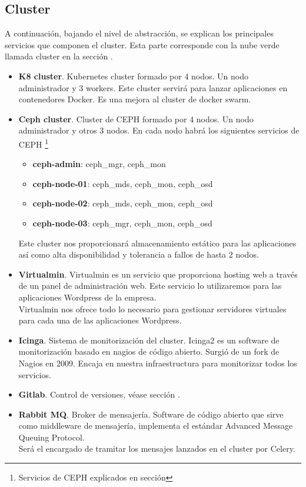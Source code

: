 	\subsection{Cluster}
		\begin{text}
			A continuación, bajando el nivel de abstracción, se explican los principales servicios que componen el cluster. Esta parte corresponde con la nube verde llamada cluster en la sección .
			\begin{itemize}
				\item \textbf{K8 cluster}. Kubernetes cluster formado por 4 nodos. Un nodo administrador y 3 workers. Este cluster servirá para lanzar aplicaciones en contenedores Docker. Es una mejora al cluster de docker swarm.
				\item \textbf{Ceph cluster}. Cluster de CEPH formado por 4 nodos. Un nodo administrador y otros 3 nodos. En cada nodo habrá los siguientes servicios de CEPH \footnote{Servicios de CEPH explicados en sección }
				\begin{itemize}
					\item \textbf{ceph-admin}: ceph\_mgr, ceph\_mon
					\item \textbf{ceph-node-01}: ceph\_mds, ceph\_mon, ceph\_osd
					\item \textbf{ceph-node-02}: ceph\_mds, ceph\_mon, ceph\_osd
					\item \textbf{ceph-node-03}: ceph\_mgr, ceph\_mon, ceph\_osd
				\end{itemize}
				Este cluster nos proporcionará almacenamiento estático para las aplicaciones así como alta disponibilidad y tolerancia a fallos de hasta 2 nodos.
				
				\item \textbf{Virtualmin}. Virtualmin \cite{virtualmin:online} es un servicio que proporciona hosting web a través de un panel de administración web. Este servicio lo utilizaremos para las aplicaciones Wordpress de la empresa. \\
				Virtualmin nos ofrece todo lo necesario para gestionar servidores virtuales para cada una de las aplicaciones Wordpress. 
				\item \textbf{Icinga}. Sistema de monitorización del cluster. Icinga2 es un software de monitorización basado en nagios de código abierto. Surgió de un fork de Nagios en 2009. Encaja en nuestra infraestructura para monitorizar todos los servicios.
				\item \textbf{Gitlab}. Control de versiones, véase sección .
				\item \textbf{Rabbit MQ}. Broker de mensajería. Software de código abierto que sirve como middleware de mensajería, implementa el estándar Advanced Message Queuing Protocol. \\ 
				Será el encargado de tramitar los mensajes lanzados en el cluster por Celery. 
			\end{itemize}
		\clearpage

\end{text}
